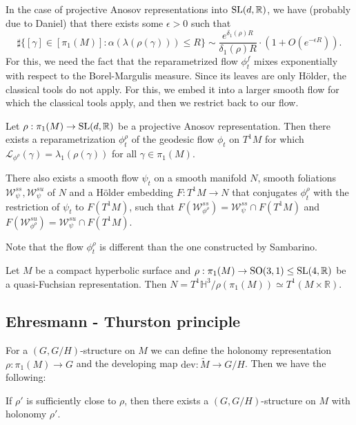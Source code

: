 \documentclass{report}
\begin{document}
In the case of projective Anosov representations into $\operatorname{{\mathrm{SL}}}(d,\mathbb R)$, we have (probably due to Daniel) that there exists some $\epsilon > 0$ such that 
\[
\sharp\{[\gamma] \in [\pi_1(M)]: \alpha(\lambda(\rho(\gamma))) \leq R\} \sim \frac{e^{\delta_1(\rho)R}}{\delta_1(\rho) R} \cdot (1 + O(e^{-\epsilon R})).
\]
For this, we need the fact that the reparametrized flow $\phi^f_t$ mixes exponentially with respect to the Borel-Margulis measure.
Since its leaves are only Hölder, the classical tools do not apply.
For this, we embed it into a larger smooth flow for which the classical tools apply, and then we restrict back to our flow.
\begin{theorem}[DMS]
    Let $\rho: \pi_1(M) \to \operatorname{{\mathrm{SL}}}(d,\mathbb R)$ be a projective Anosov representation.
    Then there exists a reparametrization $\phi^\rho_t$ of the geodesic flow $\phi_t$ on $T^1 M$ for which $\mathcal L_{\phi^\rho}(\gamma) = \lambda_1(\rho(\gamma))$ for all $\gamma \in \pi_1(M)$.

    There also exists a smooth flow $\psi_t$ on a smooth manifold $N$, smooth foliations $\mathcal W^{ss}_\psi, \mathcal W^{su}_\psi$ of $N$ and a Hölder embedding $F: T^1 M \to N$ that conjugates $\phi^\rho_t$ with the restriction of $\psi_t$ to $F(T^1 M)$, such that $F(\mathcal W^{ss}_{\phi^\rho}) = \mathcal W^{ss}_\psi \cap F(T^1 M)$ and $F(\mathcal W^{su}_{\phi^\rho}) = \mathcal W^{su}_\psi \cap F(T^1 M)$. 
\end{theorem}
Note that the flow $\phi^\rho_t$ is different than the one constructed by Sambarino.

\begin{example}
    Let $M$ be a compact hyperbolic surface and $\rho: \pi_1(M) \to \operatorname{{\mathrm{SO}}}(3,1) \leq \operatorname{{\mathrm{SL}}}(4,\mathbb R)$ be a quasi-Fuchsian representation.
    Then $N = T^1 \mathbb H^3 / \rho(\pi_1(M)) \simeq T^1(M \times \mathbb R)$.
\end{example}
\subsection{Ehresmann - Thurston principle}
For a $(G, G/H)$-structure on $M$ we can define the holonomy representation $\rho: \pi_1(M) \to G$ and the developing map $\mathrm{dev}: \widetilde M \to G/H$.
Then we have the following:
\begin{theorem}
    If $\rho'$ is sufficiently close to $\rho$, then there exists a $(G, G/H)$-structure on $M$ with holonomy $\rho'$.
\end{theorem}
\end{document}
